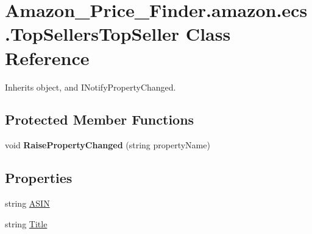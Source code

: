 \hypertarget{class_amazon___price___finder_1_1amazon_1_1ecs_1_1_top_sellers_top_seller}{\section{Amazon\-\_\-\-Price\-\_\-\-Finder.\-amazon.\-ecs.\-Top\-Sellers\-Top\-Seller Class Reference}
\label{class_amazon___price___finder_1_1amazon_1_1ecs_1_1_top_sellers_top_seller}
}


 




Inherits object, and I\-Notify\-Property\-Changed.

\subsection*{Protected Member Functions}
\begin{DoxyCompactItemize}
\item 
\hypertarget{class_amazon___price___finder_1_1amazon_1_1ecs_1_1_top_sellers_top_seller_a82576f7ac0ed173cb464fbac589cec36}{void {\bfseries Raise\-Property\-Changed} (string property\-Name)}\label{class_amazon___price___finder_1_1amazon_1_1ecs_1_1_top_sellers_top_seller_a82576f7ac0ed173cb464fbac589cec36}

\end{DoxyCompactItemize}
\subsection*{Properties}
\begin{DoxyCompactItemize}
\item 
\hypertarget{class_amazon___price___finder_1_1amazon_1_1ecs_1_1_top_sellers_top_seller_a4e13428436cbb7ce7a8ecd241b5f5d8f}{string \hyperlink{class_amazon___price___finder_1_1amazon_1_1ecs_1_1_top_sellers_top_seller_a4e13428436cbb7ce7a8ecd241b5f5d8f}{A\-S\-I\-N}}\label{class_amazon___price___finder_1_1amazon_1_1ecs_1_1_top_sellers_top_seller_a4e13428436cbb7ce7a8ecd241b5f5d8f}

\begin{DoxyCompactList}\small\item\em \end{DoxyCompactList}\item 
\hypertarget{class_amazon___price___finder_1_1amazon_1_1ecs_1_1_top_sellers_top_seller_af871bef9e876f8c39187fb64c707a065}{string \hyperlink{class_amazon___price___finder_1_1amazon_1_1ecs_1_1_top_sellers_top_seller_af871bef9e876f8c39187fb64c707a065}{Title}}\label{class_amazon___price___finder_1_1amazon_1_1ecs_1_1_top_sellers_top_seller_af871bef9e876f8c39187fb64c707a065}

\begin{DoxyCompactList}\small\item\em \end{DoxyCompactList}\end{DoxyCompactItemize}

